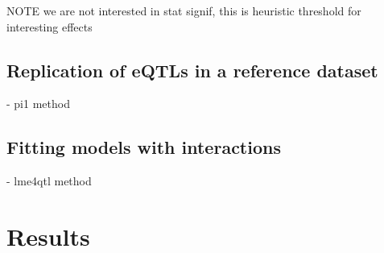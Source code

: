 


NOTE we are not interested in stat signif, this is heuristic threshold for interesting effects

\subsection{Replication of eQTLs in a reference dataset}

- pi1 method

\subsection{Fitting models with interactions}

- lme4qtl method

\section{Results}

